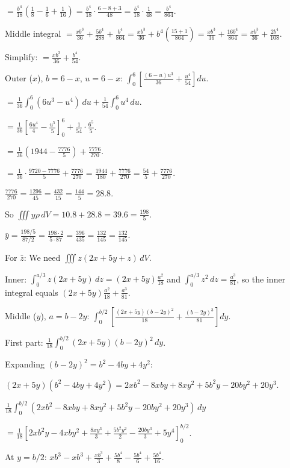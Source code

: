 \begin{enumerate}
\begin{enumerate}
$= \frac{b^4}{18}\left(\frac{1}{8}-\frac{1}{6}+\frac{1}{16}\right) = \frac{b^4}{18}\cdot\frac{6-8+3}{48} = \frac{b^4}{18}\cdot\frac{1}{48} = \frac{b^4}{864}$.

Middle integral $= \frac{xb^3}{36}+\frac{5b^4}{288}+\frac{b^4}{864} = \frac{xb^3}{36}+b^4\left(\frac{15+1}{864}\right) = \frac{xb^3}{36}+\frac{16b^4}{864} = \frac{xb^3}{36}+\frac{2b^4}{108}$.

Simplify: $= \frac{xb^3}{36}+\frac{b^4}{54}$.

Outer ($x$), $b=6-x$, $u=6-x$:
$\int_0^6\left[\frac{(6-u)u^3}{36}+\frac{u^4}{54}\right]du$.

$= \frac{1}{36}\int_0^6(6u^3-u^4)\,du+\frac{1}{54}\int_0^6 u^4\,du$.

$= \frac{1}{36}\left[\frac{6u^4}{4}-\frac{u^5}{5}\right]_0^6+\frac{1}{54}\cdot\frac{6^5}{5}$.

$= \frac{1}{36}\left(1944-\frac{7776}{5}\right)+\frac{7776}{270}$.

$= \frac{1}{36}\cdot\frac{9720-7776}{5}+\frac{7776}{270} = \frac{1944}{180}+\frac{7776}{270} = \frac{54}{5}+\frac{7776}{270}$.

$\frac{7776}{270} = \frac{1296}{45} = \frac{432}{15} = \frac{144}{5} = 28.8$.

So $\iiint y\rho\,dV = 10.8+28.8 = 39.6 = \frac{198}{5}$.

$\bar{y} = \frac{198/5}{87/2} = \frac{198\cdot 2}{5\cdot 87} = \frac{396}{435} = \frac{132}{145} = \frac{132}{145}$.

For $\bar{z}$: We need $\iiint z(2x+5y+z)\,dV$.

Inner: $\int_0^{a/3}z(2x+5y)\,dz = (2x+5y)\frac{a^2}{18}$ and $\int_0^{a/3}z^2\,dz = \frac{a^3}{81}$, so the inner integral equals $(2x+5y)\frac{a^2}{18}+\frac{a^3}{81}$.

Middle ($y$), $a=b-2y$:
$\int_0^{b/2}\left[\frac{(2x+5y)(b-2y)^2}{18}+\frac{(b-2y)^3}{81}\right]dy$.

First part: $\frac{1}{18}\int_0^{b/2}(2x+5y)(b-2y)^2\,dy$.

Expanding $(b-2y)^2 = b^2-4by+4y^2$:

$(2x+5y)(b^2-4by+4y^2) = 2xb^2-8xby+8xy^2+5b^2 y-20by^2+20y^3$.

$\frac{1}{18}\int_0^{b/2}(2xb^2-8xby+8xy^2+5b^2 y-20by^2+20y^3)\,dy$

$= \frac{1}{18}\left[2xb^2 y-4xby^2+\frac{8xy^3}{3}+\frac{5b^2 y^2}{2}-\frac{20by^3}{3}+5y^4\right]_0^{b/2}$.

At $y=b/2$: $xb^3-xb^3+\frac{xb^3}{3}+\frac{5b^4}{8}-\frac{5b^4}{6}+\frac{5b^4}{16}$.


\end{enumerate}
\end{enumerate}
